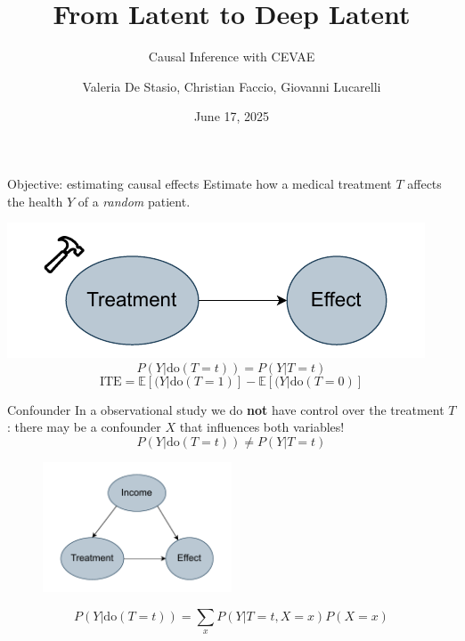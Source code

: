 \documentclass[10pt]{beamer}
\title{From Latent to Deep Latent}
\subtitle{Causal Inference with CEVAE}
\date{June 17, 2025}
\author[longname]{Valeria De Stasio, Christian Faccio, Giovanni Lucarelli}
\begin{document}
\maketitle

\begin{frame}{Objective: estimating causal effects}
    Estimate how a medical treatment $T$ affects the health $Y$ of a \textit{random} patient.

    \includegraphics[width=\textwidth]{images/no_confounders.pdf}
  \begin{equation*}
    P(Y|\text{do}(T=t))=P(Y|T=t)
  \end{equation*}
  \begin{equation*}
    \text{ITE} = \mathbb{E}[(Y|\text{do}(T=1)]-\mathbb{E}[(Y|\text{do}(T=0)]
  \end{equation*}
  

\end{frame}


\begin{frame}{Confounder}
  In a observational study we do \textbf{not} have control over 
  the treatment $T$: there may be a confounder $X$ that influences both variables!
  \begin{equation*}
    P(Y|\text{do}(T=t))\ne P(Y|T=t)
  \end{equation*}
    \begin{figure}
    \centering
    \includegraphics[width=0.5\textwidth]{images/unconfoundness.pdf}
  \end{figure}
  \begin{equation*}
    P(Y|\text{do}(T=t)) = \sum_{x} P(Y|T=t, X=x) P(X=x)
  \end{equation*}
\end{frame}
\end{document}
